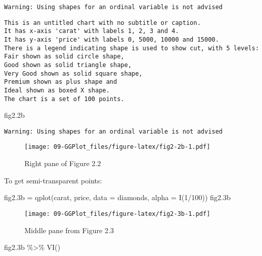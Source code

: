 \documentclass[
]{book}
\newenvironment{Shaded}{\begin{snugshade}}{\end{snugshade}}
\newcommand{\AttributeTok}[1]{\textcolor[rgb]{0.77,0.63,0.00}{#1}}
\newcommand{\DecValTok}[1]{\textcolor[rgb]{0.00,0.00,0.81}{#1}}
\newcommand{\FloatTok}[1]{\textcolor[rgb]{0.00,0.00,0.81}{#1}}
\newcommand{\FunctionTok}[1]{\textcolor[rgb]{0.00,0.00,0.00}{#1}}
\newcommand{\NormalTok}[1]{#1}
\newcommand{\OtherTok}[1]{\textcolor[rgb]{0.56,0.35,0.01}{#1}}
\newcommand{\SpecialCharTok}[1]{\textcolor[rgb]{0.00,0.00,0.00}{#1}}
\begin{document}
\begin{verbatim}
Warning: Using shapes for an ordinal variable is not advised
\end{verbatim}

\begin{verbatim}
This is an untitled chart with no subtitle or caption.
It has x-axis 'carat' with labels 1, 2, 3 and 4.
It has y-axis 'price' with labels 0, 5000, 10000 and 15000.
There is a legend indicating shape is used to show cut, with 5 levels:
Fair shown as solid circle shape, 
Good shown as solid triangle shape, 
Very Good shown as solid square shape, 
Premium shown as plus shape and 
Ideal shown as boxed X shape.
The chart is a set of 100 points.
\end{verbatim}

\begin{Shaded}
\begin{Highlighting}[]
\NormalTok{fig2}\FloatTok{.2}\NormalTok{b}
\end{Highlighting}
\end{Shaded}

\begin{verbatim}
Warning: Using shapes for an ordinal variable is not advised
\end{verbatim}

\begin{figure}
\centering
\texttt{[image: 09-GGPlot\_files/figure-latex/fig2-2b-1.pdf]}
\caption{\label{fig:fig2-2b}Right pane of Figure 2.2}
\end{figure}

To get semi-transparent points:

\begin{Shaded}
\begin{Highlighting}[]
\NormalTok{fig2}\FloatTok{.3}\NormalTok{b }\OtherTok{=} \FunctionTok{qplot}\NormalTok{(carat, price, }\AttributeTok{data =}\NormalTok{ diamonds, }\AttributeTok{alpha =} \FunctionTok{I}\NormalTok{(}\DecValTok{1}\SpecialCharTok{/}\DecValTok{100}\NormalTok{))    }
\NormalTok{fig2}\FloatTok{.3}\NormalTok{b}
\end{Highlighting}
\end{Shaded}

\begin{figure}
\centering
\texttt{[image: 09-GGPlot\_files/figure-latex/fig2-3b-1.pdf]}
\caption{\label{fig:fig2-3b}Middle pane from Figure 2.3}
\end{figure}

\begin{Shaded}
\begin{Highlighting}[]
\NormalTok{fig2}\FloatTok{.3}\NormalTok{b }\SpecialCharTok{\%\textgreater{}\%} \FunctionTok{VI}\NormalTok{()   }
\end{Highlighting}
\end{Shaded}
\end{document}
